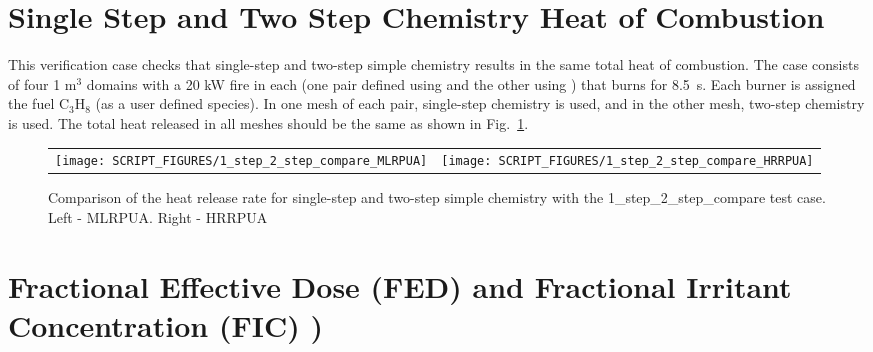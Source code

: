 \documentclass[11pt]{book}
\begin{document}
\section{Single Step and Two Step Chemistry Heat of Combustion}
\label{1_step_2_step_M}
\label{1_step_2_step_H}

This verification case checks that single-step and two-step simple chemistry results in the same total heat of combustion. The case consists of four 1 m$^3$ domains with a 20 kW fire in each (one pair defined using  and the other using ) that burns for 8.5~s. Each burner is assigned the fuel C$_3$H$_8$ (as a user defined species). In one mesh of each pair, single-step chemistry is used, and in the other mesh, two-step chemistry is used. The total heat released in all meshes should be the same as shown in Fig.~\ref{fig:1_step_2_step}.
\begin{figure}[h!]
   \begin{tabular*}{\textwidth}{lr}
      \texttt{[image: SCRIPT\_FIGURES/1\_step\_2\_step\_compare\_MLRPUA]} &
      \texttt{[image: SCRIPT\_FIGURES/1\_step\_2\_step\_compare\_HRRPUA]}
   \end{tabular*}
   \caption[Result of the 1\_step\_2\_step\_compare test case]{Comparison of the heat release rate for single-step and two-step simple chemistry with the 1\_step\_2\_step\_compare test case. Left - MLRPUA. Right - HRRPUA}
   \label{fig:1_step_2_step}
\end{figure}



\section{Fractional Effective Dose (FED) and Fractional Irritant Concentration (FIC) ) }
\end{document}
